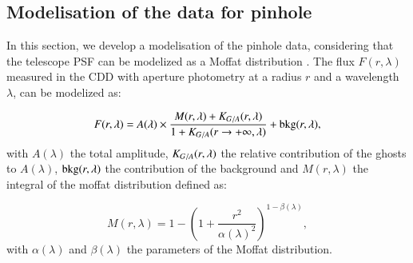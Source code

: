 \subsection{Modelisation of the \SD data for \spinhole pinhole}


In this section, we develop a modelisation of the \spinhole pinhole data, considering that the \SD telescope PSF can be modelized as a Moffat distribution \citep{moffat}. The flux $F(r, \lambda)$ measured in the CDD with aperture photometry at a radius $r$ and a wavelength $\lambda$, can be modelized as: 


\begin{equation}
F(r, \lambda) = A(\lambda) \times \frac{M(r, \lambda) + K_{G/A}(r, \lambda)}{1 + K_{G/A}(r \rightarrow +\infty, \lambda)} + \mathrm{bkg}(r, \lambda),
\label{eq:moffat_model}
\end{equation}
with $A(\lambda)$ the total amplitude, $K_{G/A}(r, \lambda)$ the relative contribution of the ghosts to $A(\lambda)$, $\mathrm{bkg}(r, \lambda)$ the contribution of the background and $M(r, \lambda)$ the integral of the moffat distribution defined as:

\begin{equation}
M(r, \lambda)= 1 - \left( 1+\frac{r^2}{\alpha(\lambda)^2} \right)^{1-\beta(\lambda)},
\end{equation}
with $\alpha(\lambda)$ and $\beta(\lambda)$ the parameters of the Moffat distribution.

